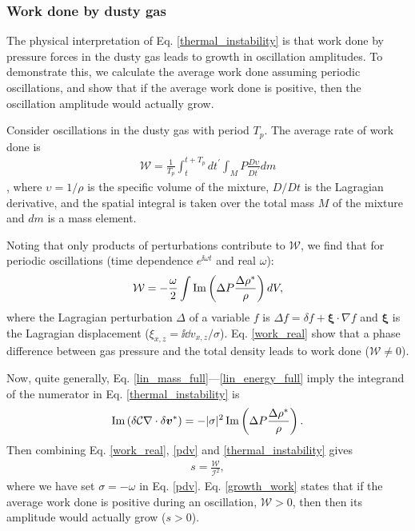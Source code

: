 

\subsubsection{Work done by dusty gas} 

The physical interpretation of Eq. \ref{thermal_instability} is that 
work done by pressure forces in the dusty gas leads to growth in
oscillation amplitudes. To demonstrate this, we calculate the average
work done assuming periodic oscillations, and show that if the average
work done is positive, then the 
oscillation amplitude would actually grow. 

Consider oscillations in the dusty gas with period $T_p$. 
The average rate of work done is 
\begin{align}
  \mathcal{W} = \frac{1}{T_p}\int^{t+T_p}_{t}dt^\prime\int_M P
  \frac{D\upsilon}{Dt^\prime} dm \label{work_def} 
\end{align}
\citep{cox67}, 
where $\upsilon=1/\rho$ is the specific volume of the mixture, $D/Dt$
is the Lagragian derivative, and the 
spatial integral is taken over the total mass $M$ of the mixture and
$dm$ is a mass element. 

Noting that only products of perturbations contribute to
$\mathcal{W}$, we find that for periodic oscillations (time dependence 
$e^{\ii\omega t}$ and real $\omega$): 
\begin{align}
  \mathcal{W} = - \frac{\omega}{2} \int \operatorname{Im}\left(\Delta P
  \frac{\Delta \rho^*}{\rho}\right)dV,\label{work_real}
\end{align}
where %
 the Lagragian perturbation $\Delta$ of a variable $f$ is 
$\Delta f = \delta f + \bm{\xi}\cdot\nabla f$ and $\bm{\xi}$ is the
Lagragian displacement ($    \xi_{x,z} =  \ii \dd v_{x,z}/\sigma$).  
Eq. \ref{work_real} show that a phase difference between gas pressure and
the total density leads to work done
($\mathcal{W}\neq0$).  

Now, quite generally, Eq. \ref{lin_mass_full}---\ref{lin_energy_full} 
imply the integrand of the numerator in Eq. \ref{thermal_instability} 
is 
\begin{align} 
  \operatorname{Im} \left(\delta \mathcal{C}
  \nabla\cdot\delta \bm{v}^*\right) = 
  -|\sigma|^2\operatorname{Im} \left(\Delta P 
  \frac{\Delta\rho^*}{\rho}\right). \label{pdv}
\end{align}
Then combining Eq. \ref{work_real}, \ref{pdv} and
\ref{thermal_instability} 
gives  
\begin{align}
s = \frac{\mathcal{W}}{\mathcal{I}^2}, \label{growth_work}
\end{align}
where we have set $\sigma= - \omega$ in 
Eq. \ref{pdv}. Eq. \ref{growth_work} states that if the average work
done is positive during an oscillation, $\mathcal{W}>0$, then 
then its amplitude would actually grow ($s>0$).  %

